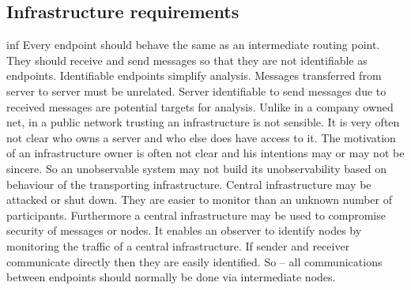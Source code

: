 \documentclass[12pt,journal,compsoc]{IEEEtran}
\begin{document}
\subsection{Infrastructure requirements}
\begin{entity}{inf}
		Every endpoint should behave the same as an intermediate routing point. They should receive and send messages so that they are not identifiable as endpoints. Identifiable endpoints simplify analysis.
		Messages transferred from server to server must be unrelated. Server identifiable to send messages due to received messages are potential targets for analysis.
		Unlike in a company owned net, in a public network trusting an infrastructure is not sensible. It is very often not clear who owns a server and who else does have access to it. The motivation of an infrastructure owner is often not clear and his intentions may or may not be sincere. So an unobservable system may not build its unobservability based on behaviour of the transporting infrastructure.
		Central infrastructure may be attacked or shut down. They are easier to monitor than an unknown number of participants. Furthermore a central infrastructure may be used to compromise security of messages or nodes. It enables an observer to identify nodes by monitoring the traffic of a central infrastructure.
		If sender and receiver communicate directly then they are easily identified. So -- all communications between endpoints should normally be done via intermediate nodes.
\end{entity} 

%
%
\end{document}
